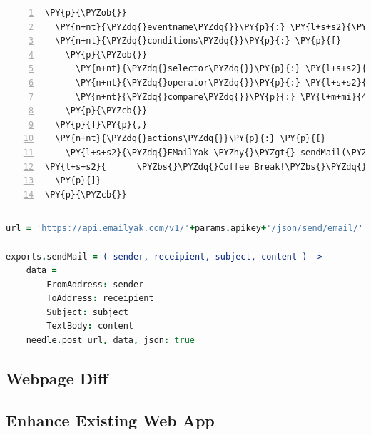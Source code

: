 \begin{Verbatim}[samepage=true,frame=single,fontsize=\footnotesize,commandchars=\\\{\},numbers=left,firstnumber=1,stepnumber=1,xleftmargin
=.3in]
\PY{p}{\PYZob{}}
  \PY{n+nt}{\PYZdq{}eventname\PYZdq{}}\PY{p}{:} \PY{l+s+s2}{\PYZdq{}uptimestatistics\PYZdq{}}\PY{p}{,}
  \PY{n+nt}{\PYZdq{}conditions\PYZdq{}}\PY{p}{:} \PY{p}{[}
    \PY{p}{\PYZob{}}
      \PY{n+nt}{\PYZdq{}selector\PYZdq{}}\PY{p}{:} \PY{l+s+s2}{\PYZdq{}.currentlyon\PYZdq{}}\PY{p}{,}
      \PY{n+nt}{\PYZdq{}operator\PYZdq{}}\PY{p}{:} \PY{l+s+s2}{\PYZdq{}\PYZgt{}\PYZdq{}}\PY{p}{,}
      \PY{n+nt}{\PYZdq{}compare\PYZdq{}}\PY{p}{:} \PY{l+m+mi}{42}
    \PY{p}{\PYZcb{}}
  \PY{p}{]}\PY{p}{,}
  \PY{n+nt}{\PYZdq{}actions\PYZdq{}}\PY{p}{:} \PY{p}{[}
    \PY{l+s+s2}{\PYZdq{}EMailYak \PYZhy{}\PYZgt{} sendMail(\PYZbs{}\PYZdq{}eca\PYZhy{}engine@mscliveweb.simpleyak.com\PYZbs{}\PYZdq{},[usermaillist],}
\PY{l+s+s2}{      \PYZbs{}\PYZdq{}Coffee Break!\PYZbs{}\PYZdq{},\PYZbs{}\PYZdq{}Let\PYZsq{}s go for a coffee at 10!\PYZbs{}\PYZdq{})\PYZdq{}}
  \PY{p}{]}
\PY{p}{\PYZcb{}}
\end{Verbatim}
\vspace{-0.7cm}
\begin{lstlisting}[float=h,language=OwnRule,caption={Rule; Coffee Break Invitation},label={lst:ruleCoffeeBreak},frame=no]
\end{lstlisting}

\begin{lstlisting}[float=h,language=CoffeeScript,caption={Action Dispatcher; EMailYak, in CoffeeScript},label={lst:adEmailYak}]
url = 'https://api.emailyak.com/v1/'+params.apikey+'/json/send/email/'

exports.sendMail = ( sender, receipient, subject, content ) ->
	data =
		FromAddress: sender
		ToAddress: receipient
		Subject: subject
		TextBody: content
	needle.post url, data, json: true
\end{lstlisting}


\subsection{Webpage Diff}




\subsection{Enhance Existing Web App}




